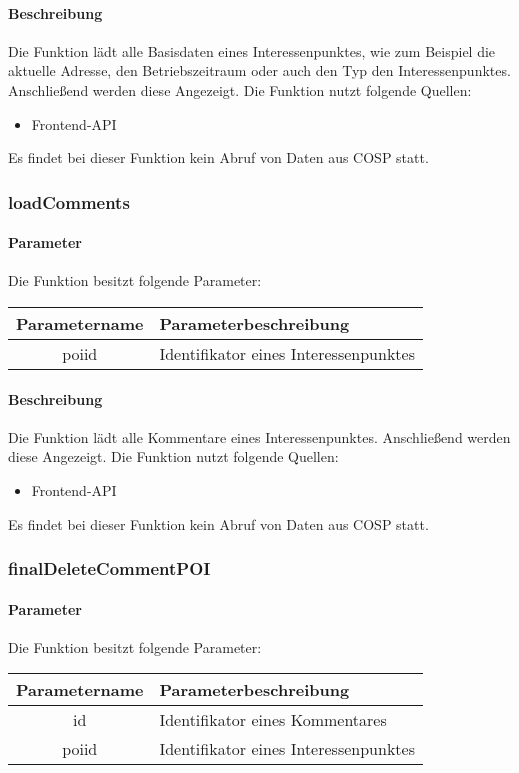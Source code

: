 \paragraph{Beschreibung} Die Funktion lädt alle Basisdaten eines Interessenpunktes, wie zum Beispiel die aktuelle Adresse, den Betriebszeitraum oder auch den Typ den Interessenpunktes. Anschließend werden diese Angezeigt. Die Funktion nutzt folgende Quellen:
\begin{itemize}
	\item Frontend-API
\end{itemize}
Es findet bei dieser Funktion kein Abruf von Daten aus {\glqq COSP\grqq} statt.
\subsubsection{loadComments}
\paragraph{Parameter} Die Funktion besitzt folgende Parameter:
\begin{table}[H]
	\begin{tabular}{|c|p{11cm}|}
		\hline
		\textbf{Parametername} & \textbf{Parameterbeschreibung} \\ \hline
		poiid & Identifikator eines Interessenpunktes \\ \hline
	\end{tabular}
\end{table}
\paragraph{Beschreibung} Die Funktion lädt alle Kommentare eines Interessenpunktes. Anschließend werden diese Angezeigt. Die Funktion nutzt folgende Quellen:
\begin{itemize}
	\item Frontend-API
\end{itemize}
Es findet bei dieser Funktion kein Abruf von Daten aus {\glqq COSP\grqq} statt.
\subsubsection{finalDeleteCommentPOI}
\paragraph{Parameter} Die Funktion besitzt folgende Parameter:
\begin{table}[H]
	\begin{tabular}{|c|p{11cm}|}
		\hline
		\textbf{Parametername} & \textbf{Parameterbeschreibung} \\ \hline
		id    & Identifikator eines Kommentares \\ \hline
		poiid & Identifikator eines Interessenpunktes \\ \hline
	\end{tabular}
\end{table}
